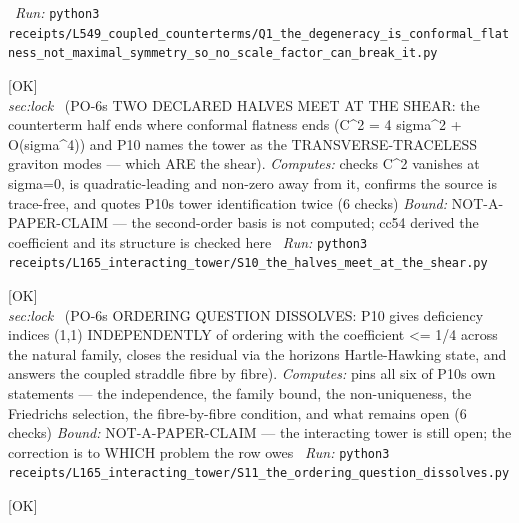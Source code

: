 \begin{description}
\ \emph{Run:} \texttt{python3 receipts/L549\_coupled\_counterterms/Q1\_the\_degeneracy\_is\_conformal\_flatness\_not\_maximal\_symmetry\_so\_no\_scale\_factor\_can\_break\_it.py}
\item[\label{rcpt:S10_the_halves_meet_at_the_shear}\textbf{}\quad\texttt{S10\_the\_halves\_meet\_at\_the\_shear}]\hfill\textsf{[OK]}\\
\textit{sec:lock} \ (PO-6s TWO DECLARED HALVES MEET AT THE SHEAR: the counterterm half ends where conformal flatness ends (C\textasciicircum{}2 = 4 sigma\textasciicircum{}2 + O(sigma\textasciicircum{}4)) and P10 names the tower as the TRANSVERSE-TRACELESS graviton modes --- which ARE the shear). 
\emph{Computes:} checks C\textasciicircum{}2 vanishes at sigma=0, is quadratic-leading and non-zero away from it, confirms the source is trace-free, and quotes P10s tower identification twice (6 checks)
 \emph{Bound:} NOT-A-PAPER-CLAIM --- the second-order basis is not computed; cc54 derived the coefficient and its structure is checked here
\ \emph{Run:} \texttt{python3 receipts/L165\_interacting\_tower/S10\_the\_halves\_meet\_at\_the\_shear.py}
\item[\label{rcpt:S11_the_ordering_question_dissolves}\textbf{}\quad\texttt{S11\_the\_ordering\_question\_dissolves}]\hfill\textsf{[OK]}\\
\textit{sec:lock} \ (PO-6s ORDERING QUESTION DISSOLVES: P10 gives deficiency indices (1,1) INDEPENDENTLY of ordering with the coefficient <= 1/4 across the natural family, closes the residual via the horizons Hartle-Hawking state, and answers the coupled straddle fibre by fibre). 
\emph{Computes:} pins all six of P10s own statements --- the independence, the family bound, the non-uniqueness, the Friedrichs selection, the fibre-by-fibre condition, and what remains open (6 checks)
 \emph{Bound:} NOT-A-PAPER-CLAIM --- the interacting tower is still open; the correction is to WHICH problem the row owes
\ \emph{Run:} \texttt{python3 receipts/L165\_interacting\_tower/S11\_the\_ordering\_question\_dissolves.py}
\item[\rcptlabel{P10_ordering_selection_is_external}{P10R21}\textbf{P10R21}\quad\texttt{P10\_ordering\_selection\_is\_external}]\hfill\textsf{[OK]}\\

\end{description}
